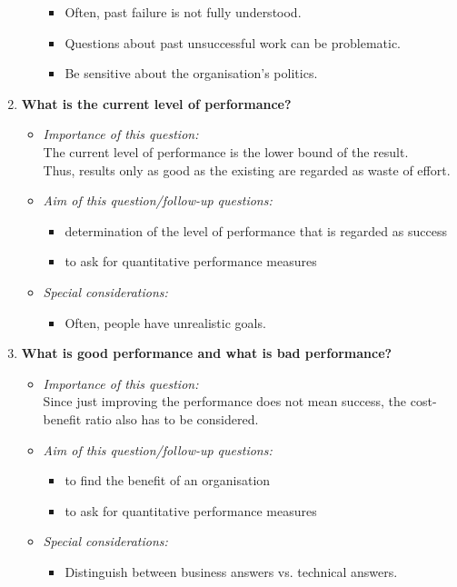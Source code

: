 \documentclass[a4paper, landscape, 6pt, fleqn]{scrartcl}
\renewcommand{\emph}[1]{\textbf{#1}}
\begin{document}
\begin{multicols*}{4}
\begin{enumerate}
\begin{itemize}
\begin{itemize}
\item Often, past failure is not fully understood.
\item Questions about past unsuccessful work can be problematic.
\item Be sensitive about the organisation's politics.
\end{itemize}
\end{itemize}
\item \emph{What is the current level of performance?}
\begin{itemize}
\item \textit{Importance of this question:} \\
The current level of performance is the lower bound of the result. \\
Thus, results only as good as the existing are regarded as waste of effort.
\item \textit{Aim of this question/follow-up questions:}
\begin{itemize}
\item determination of the level of performance that is regarded as success
\item to ask for quantitative performance measures
\end{itemize}
\item \textit{Special considerations:}
\begin{itemize}
\item Often, people have unrealistic goals.
\end{itemize}
\end{itemize}
\item \emph{What is good performance and what is bad performance?}
\begin{itemize}
\item \textit{Importance of this question:} \\
Since just improving the performance does not mean success, the cost-benefit ratio also has to be considered.
\item \textit{Aim of this question/follow-up questions:}
\begin{itemize}
\item to find the benefit of an organisation
\item to ask for quantitative performance measures
\end{itemize}
\item \textit{Special considerations:}
\begin{itemize}
\item Distinguish between business answers vs. technical answers.
\end{itemize}
\end{itemize}
\end{enumerate}


\end{multicols*}
\end{document}
